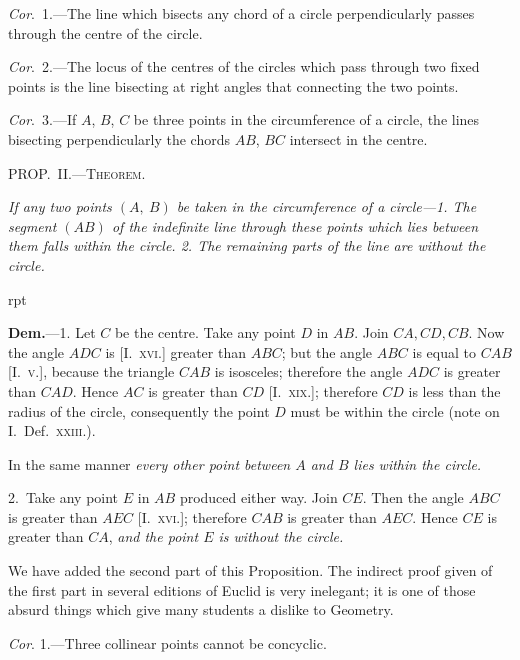 \documentclass[oneside]{book}
\newcommand\mypropl[2]{
\bigskip\Needspace*{4\baselineskip}\begin{center}\textsc{#1}\end{center}
\hspace{\parindent}\emph{#2}\par\medskip
}
\newcommand\imgflow[3]{
\setcounter{wrapwidth}{#1}
\begin{wrapfigure}[#2]{r}{\value{wrapwidth}pt}
\begin{center}
\vspace{-0.3in}
\end{center}
\end{wrapfigure}
}
\begin{document}
\textit{Cor}.~1.---The line which bisects any chord of a circle
perpendicularly passes through the centre of the circle.

\textit{Cor}.~2.---The locus of the centres of the circles which
pass through two fixed points is the line bisecting at
right angles that connecting the two points.

\textit{Cor}.~3.---If $A$, $B$, $C$ be three points in the circumference
of a circle, the lines bisecting perpendicularly
the chords $AB$, $BC$ intersect in the centre.



\mypropl{PROP\@.~II\@.---Theorem.}{If any two points $(A,\ B)$ be taken in the circumference
of a circle---\textrm{1.} The segment $(AB)$ of the indefinite line
through these points which lies between them falls within
the circle. \textrm{2.} The remaining\label{remainiug} parts of the line are without
the circle.}

\imgflow{140}{9}{f105}

\textbf{Dem.}---1. Let $C$ be the centre. Take any point $D$
in $AB$. Join $CA, CD, CB$.
Now the angle $ADC$ is
[I.\ \textsc{xvi.}] greater than $ABC$;
but the angle $ABC$ is equal
to $CAB$ [I.\ \textsc{v.}], because the
triangle $CAB$ is isosceles;
therefore the angle $ADC$ is
greater than $CAD$. Hence
$AC$ is greater than $CD$ [I.\ \textsc{xix.}]; therefore $CD$ is less
than the radius of the circle, consequently the point $D$
must be within the circle (note on I.\ Def.\ \textsc{xxiii.}).

In the same manner \textit{every other point between $A$ and
$B$ lies within the circle.}\par\medskip

2.~Take any point $E$ in $AB$ produced either way.
Join $CE$. Then the angle $ABC$ is greater than $AEC$
[I.\ \textsc{xvi.}]; therefore $CAB$ is greater than $AEC$. Hence
$CE$ is greater than $CA$, \textit{and the point $E$ is without the
circle.}\par\medskip

\begin{footnotesize}
We have added the second part of this Proposition. The indirect
proof given of the first part in several editions of Euclid
is very inelegant; it is one of those absurd things which give
many students a dislike to Geometry.
\par\end{footnotesize}\medskip

\textit{Cor}. 1.---Three collinear points cannot be concyclic.\par\smallskip
\end{document}
